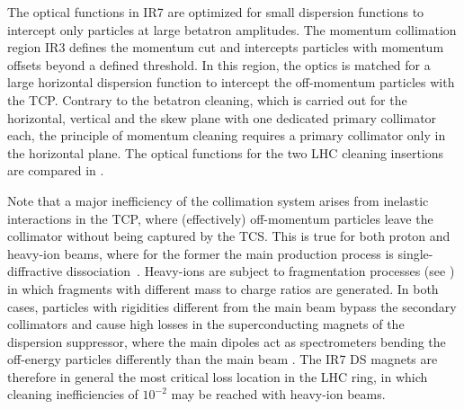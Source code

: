 The optical functions in IR7 are optimized for small dispersion functions to intercept only particles at large betatron amplitudes. The momentum collimation region IR3 defines the momentum cut and intercepts particles with momentum offsets beyond a defined threshold. In this region, the optics is matched for a large horizontal dispersion function to intercept the off-momentum particles with the TCP. Contrary to the betatron cleaning, which is carried out for the horizontal, vertical and the skew plane with one dedicated primary collimator each, the principle of momentum cleaning requires a primary collimator only in the horizontal plane. The optical functions for the two LHC cleaning insertions are compared in .  

Note that a major inefficiency of the collimation system arises from inelastic interactions in the TCP, where (effectively) off-momentum particles leave the collimator without being captured by the TCS. This is true for both proton and heavy-ion beams, where for the former the main production process is single-diffractive dissociation~\cite{ipac10:TUPEB080}. Heavy-ions are subject to fragmentation processes (see ) in which fragments with different mass to charge ratios are generated. In both cases, particles with rigidities different from the main beam bypass the secondary collimators and cause high losses in the superconducting magnets of the dispersion suppressor, where the main dipoles act as spectrometers bending the off-energy particles differently than the main beam . The IR7 DS magnets are therefore in general the most critical loss location in the LHC ring, in which cleaning inefficiencies of $10^{-2}$ may be reached with heavy-ion beams.


